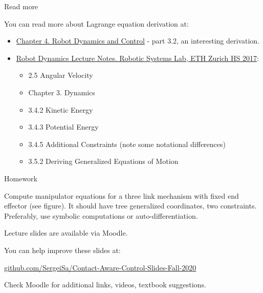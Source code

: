 \documentclass{beamer}
\begin{document}
\begin{frame}{Read more}
\begin{flushleft}

You can read more about Lagrange equation derivation at:

\begin{itemize}
    \item \href{https://www.cds.caltech.edu/~murray/books/MLS/pdf/mls94-manipdyn_v1_2.pdf}{Chapter 4. Robot Dynamics and
Control} - part 3.2, an interesting derivation.
    \item \href{https://ethz.ch/content/dam/ethz/special-interest/mavt/robotics-n-intelligent-systems/rsl-dam/documents/RobotDynamics2017/RD_HS2017script.pdf}{Robot Dynamics Lecture Notes. Robotic Systems Lab, ETH Zurich HS 2017}:
    \begin{itemize}
        \item 2.5 Angular Velocity
        \item Chapter 3. Dynamics
        \item 3.4.2 Kinetic Energy
        \item 3.4.3 Potential Energy
        \item 3.4.5 Additional Constraints (note some notational differences)
        \item 3.5.2 Deriving Generalized Equations of Motion
    \end{itemize}
    
    




\end{itemize}

\end{flushleft}
\end{frame}


\begin{frame}{Homework}
\begin{flushleft}

Compute manipulator equations for a three link mechanism with fixed end effector (see figure). It should have tree generalized coordinates, two constraints. Preferably, use symbolic computations or auto-differentiation.

\begin{figure}
    \centering
    
\end{figure}

\end{flushleft}
\end{frame}



\begin{frame}
\centerline{Lecture slides are available via Moodle.}
\bigskip
\centerline{You can help improve these slides at:}
\centerline{\href{https://github.com/SergeiSa/Contact-Aware-Control-Slides-Fall-2020}{github.com/SergeiSa/Contact-Aware-Control-Slides-Fall-2020}}
\bigskip
\centerline{Check Moodle for additional links, videos, textbook suggestions.}
\end{frame}
\end{document}
